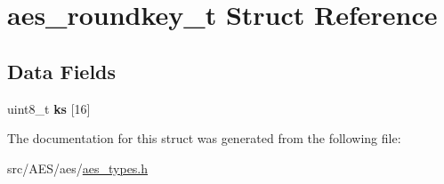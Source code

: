 \hypertarget{structaes__roundkey__t}{\section{aes\+\_\+roundkey\+\_\+t Struct Reference}
\label{structaes__roundkey__t}
}
\subsection*{Data Fields}
\begin{DoxyCompactItemize}
\item 
\hypertarget{structaes__roundkey__t_a9289449e3402751c6996e0c14c3750b8}{uint8\+\_\+t {\bfseries ks} \mbox{[}16\mbox{]}}\label{structaes__roundkey__t_a9289449e3402751c6996e0c14c3750b8}

\end{DoxyCompactItemize}


The documentation for this struct was generated from the following file\+:\begin{DoxyCompactItemize}
\item 
src/\+A\+E\+S/aes/\hyperlink{aes__types_8h}{aes\+\_\+types.\+h}\end{DoxyCompactItemize}
